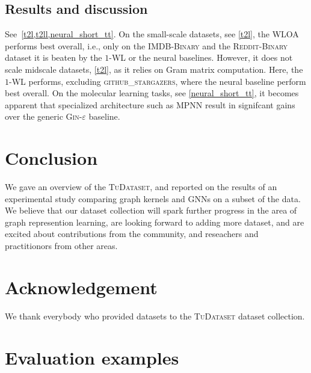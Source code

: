 \documentclass{article}
\theoremstyle{definition}
\begin{document}
\subsection{Results and discussion}
See~\cref{t2l,t2ll,neural_short_tt}. On the small-scale datasets, see \cref{t2l}, the \textsc{WLOA} performs best overall, i.e., only on the \textsc{IMDB-Binary} and the \textsc{Reddit-Binary} dataset it is beaten by the $1$-\textsc{WL} or the neural baselines. However, it does not scale midscale datasets, \cref{t2l}, as it relies on Gram matrix computation. Here, the $1$-WL performs, excluding \textsc{github\_stargazers}, where the neural baseline perform best overall. On the molecular learning tasks, see \cref{neural_short_tt}, it becomes apparent that specialized architecture such as \textsc{MPNN} result in signifcant gains over the generic \textsc{Gin-$\varepsilon$} baseline. 












\section{Conclusion}

We gave an overview of the \textsc{TuDataset}, and reported on the results of an experimental study comparing graph kernels and GNNs on a subset of the data. We believe that our dataset collection will spark further progress in the area of graph represention learning, are looking forward to adding more dataset, and are excited about contributions from the community, and reseachers and practitionors from other areas.


\section{Acknowledgement}

We thank everybody who provided datasets to the  \textsc{TuDataset} dataset collection.




\appendix

\onecolumn



\section{Evaluation examples}
\end{document}

